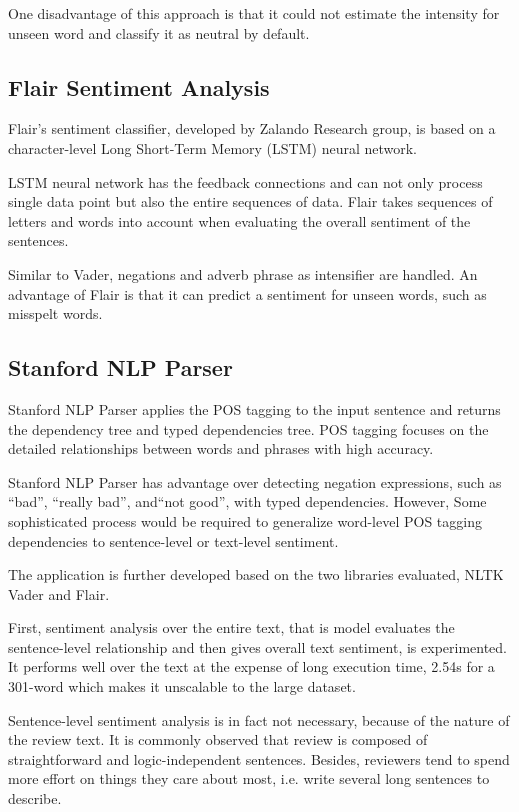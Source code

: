 \documentclass[sigconf]{acmart}
\begin{document}
One disadvantage of this approach is that it could not estimate the intensity for unseen word and classify it as neutral by default.

\subsection{Flair Sentiment Analysis\cite{Flair}}

Flair’s sentiment classifier, developed by Zalando Research group, is based on a character-level Long Short-Term Memory (LSTM)\cite{LSTM} neural network.

LSTM neural network has the feedback connections and can not only process single data point but also the entire sequences of data. Flair takes sequences of letters and words into account when evaluating the overall sentiment of the sentences.

Similar to Vader, negations and adverb phrase as intensifier are handled. An advantage of Flair is that it can predict a sentiment for unseen words, such as misspelt words.

\subsection{Stanford NLP Parser}

Stanford NLP Parser applies the POS tagging to the input sentence and returns the dependency tree and typed dependencies tree. POS tagging focuses on the detailed relationships between words and phrases with high accuracy.

Stanford NLP Parser has advantage over detecting negation expressions, such as “bad”, “really bad”, and“not good”, with typed dependencies. However, Some sophisticated process would be required to generalize word-level POS tagging dependencies to sentence-level or text-level sentiment. 

The application is further developed  based on the two libraries evaluated, NLTK Vader and Flair. 

First, sentiment analysis over the entire text, that is model evaluates the sentence-level relationship and then gives overall text sentiment, is experimented. It performs well over the text at the expense of long execution time, 2.54s for a 301-word which makes it unscalable to the large dataset.

Sentence-level sentiment analysis is in fact not necessary, because of the nature of the review text. It is commonly observed that review is composed of straightforward and logic-independent sentences. Besides, reviewers tend to spend more effort on things they care about most, i.e. write several long sentences to describe.
\end{document}
